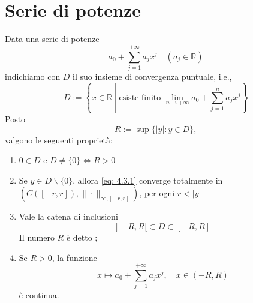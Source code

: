 \section{Serie di potenze}
\begin{proposition}[$*$]\label{prop: 4.7}
    Data una serie di potenze
    \begin{equation}
    a_{0}+\sum_{j=1}^{+\infty} a_{j} x^{j} \quad\left(a_{j} \in \mathbb{R}\right) \label{eq: 4.3.1}
    \end{equation}
    indichiamo con $D$ il suo insieme di convergenza puntuale, i.e.,
    \[D:=\left\{x \in \mathbb{R}\ \left| \text { esiste finito } \lim _{n \rightarrow+\infty} a_{0}+\sum_{j=1}^{n} a_{j} x^{j}\right.\right\}\]
    Posto
        \[R:=\sup \{|y|: y \in D\},\]
    valgono le seguenti proprietà:
    \begin{enumerate}
        \item \label{prop: 4.7.1} $0\in D$ e $D\neq \{0\}\iff R>0$
        \item \label{prop: 4.7.2} Se $y \in D \backslash\{0\}$, allora \eqref{eq: 4.3.1} converge totalmente in $\left(C([-r, r]),\|\cdot\|_{\infty,[-r, r]}\right)$, per ogni $r<|y|$
        \item \label{prop: 4.7.3} Vale la catena di inclusioni
        \[]-R, R[ \subset D \subset[-R, R]\]
        Il numero $R$ è detto ;
        \item \label{prop: 4.7.4} Se $R>0$, la funzione
    \[x \mapsto a_{0}+\sum_{j=1}^{+\infty} a_{j} x^{j}, \quad x \in(-R, R)\]
    è continua.
    \end{enumerate}
\end{proposition}
